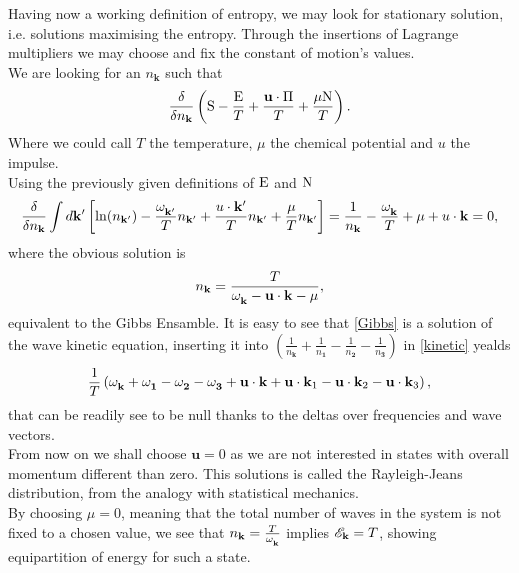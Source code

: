 Having now a working definition of entropy, we may look for stationary solution, i.e. solutions maximising the entropy. Through the insertions of Lagrange 
multipliers we may choose and fix the constant of motion's values.  \\
We are looking for an $n_\mathbf{k}$ such that 
\begin{equation}
    \frac{\delta}{\delta n_\mathbf{k}}\left( \mathrm{S} - \frac{\mathrm{E}}{T} + \frac{\mathbf{u} \cdot \Pi}{T} + \frac{\mu \mathrm{N}}{T} \right).
\end{equation}
Where we could call $T$ the temperature, $\mu$ the chemical potential and $u$ the impulse. \\
Using the previously given definitions of $\mathrm{E}$ and $\mathrm{N}$ 
\begin{equation}
    \frac{\delta}{\delta n_\mathbf{k}} \int d\mathbf{k'} \left[ \ln(n_\mathbf{k'}) -\frac{\omega^{}_\mathbf{k'}}{T}n_\mathbf{k'} + 
    \frac{u \cdot \mathbf{k'}}{T}n_\mathbf{k'}+\frac{\mu}{T} n_\mathbf{k'} \right] = 
    \frac{1}{n_\mathbf{k}} - \frac{\omega^{}_{\mathbf{k}}}{T} + \mu  +  u \cdot \mathbf{k}= 0,
\end{equation} 
where the obvious solution is 
\begin{equation}
    n_\mathbf{k} = \frac{T}{\omega^{}_{\mathbf{k}} - \mathbf{u} \cdot \mathbf{k} - \mu},
    \label{Gibbs}
\end{equation}
equivalent to the Gibbs Ensamble. It is easy to see that \eqref{Gibbs} is a solution of the wave kinetic equation, inserting it into $\left( \frac{1}{n_\mathbf{k}} 
+ \frac{1}{n_\mathbf{1}}-\frac{1}{n_\mathbf{2}}-\frac{1}{n_\mathbf{3}}\right)$ in \eqref{kinetic} yealds
\begin{equation}
    \frac{1}{T}\left( \omega^{}_{\mathbf{k}} +\omega^{}_\mathbf{1}-\omega^{}_\mathbf{2}-\omega^{}_\mathbf{3} + \mathbf{u} \cdot \mathbf{k} +\mathbf{u} \cdot \mathbf{k}_1 
    -\mathbf{u} \cdot \mathbf{k}_2 -\mathbf{u} \cdot \mathbf{k}_3 \right), 
\end{equation}
that can be readily see to be null thanks to the deltas over frequencies and wave vectors.\\
From now on we shall choose $\mathbf{u} = 0$ as we are not interested in states with overall momentum different than zero. This solutions is called  the 
Rayleigh-Jeans distribution, from the analogy with statistical mechanics.\\
By choosing $\mu = 0$, meaning that the total number of waves in the system is not fixed to a 
chosen value, we see that $n_\mathbf{k} = \frac{T}{\omega^{}_{\mathbf{k}}}$ implies $\mathscr{E}_\mathbf{k} = T$, showing equipartition of energy for such a state.\\
